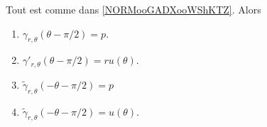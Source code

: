 \begin{proposition}	\label{PROPooCSGEooIXXVLb}
	Tout est comme dans \ref{NORMooGADXooWShKTZ}. Alors
	\begin{enumerate}
		\item		\label{ITEMooXOCYooGBpdzs}
		      \( \gamma_{r,\theta}(\theta-\pi/2)=p\).
		\item		\label{ITEMooNLBNooUeMEmE}
		      \( \gamma'_{r,\theta}(\theta-\pi/2)=ru(\theta)\).
		\item	\label{ITEMooGPMYooCFCApF}
		      \( \tilde \gamma_{r,\theta}(-\theta-\pi/2)=p\)
		\item		\label{ITEMooZZHWooDLoYRl}
		      \( \tilde \gamma_{r,\theta}(-\theta-\pi/2)=u(\theta)\).
	\end{enumerate}
\end{proposition}

